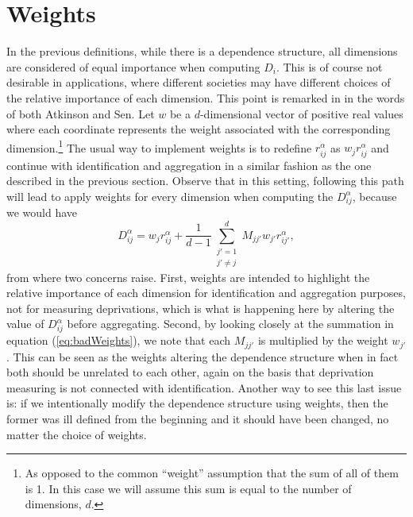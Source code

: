 \documentclass[english, a4paper,12pt]{article}
\begin{document}
\section{Weights} \label{sec:weights}
In the previous definitions, while there is a dependence structure, all dimensions are considered of equal importance when computing $D_{i}$. This is of course not desirable in applications, where different societies may have different choices of the relative importance of each dimension. This point is remarked in \cite{AlkireFoster11} in the words of both Atkinson and Sen. Let $w$ be a $d$-dimensional vector of positive real values where each coordinate represents the weight associated with the corresponding dimension.\footnote{As opposed to the common ``weight'' assumption that the sum of all of them is 1. In this case we will assume this sum is equal to the number of dimensions, $d$.} The usual way to implement weights is to redefine $r_{ij}^{\alpha}$ as $w_{j}r_{ij}^{\alpha}$ and continue with identification and aggregation in a similar fashion as the one described in the previous section. Observe that in this setting, following this path will lead to apply weights for every dimension when computing the $D_{ij}^{\alpha}$, because we would have
	\begin{equation} \label{eq:badWeights}
		D_{ij}^{\alpha} = w_{j}r_{ij}^{\alpha} + \frac{1}{d-1} \sum_{\substack{j' = 1 \\ j' \neq j}}^{d} M_{jj'} w_{j'}r_{ij'}^{\alpha},
	\end{equation}
from where two concerns raise. First, weights are intended to highlight the relative importance of each dimension for identification and aggregation purposes, not for measuring deprivations, which is what is happening here by altering the value of $D_{ij}^{\alpha}$ before aggregating. Second, by looking closely at the summation in equation (\ref{eq:badWeights}), we note that each $M_{jj'}$ is multiplied by the weight $w_{j'}$. This can be seen as the weights altering the dependence structure when in fact both should be unrelated to each other, again on the basis that deprivation measuring is not connected with identification. Another way to see this last issue is: if we intentionally modify the dependence structure using weights, then the former was ill defined from the beginning and it should have been changed, no matter the choice of weights.
\end{document}
